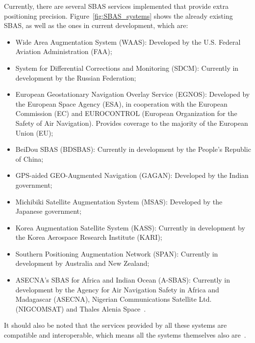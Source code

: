 Currently, there are several SBAS services implemented that provide extra positioning precision. Figure~\ref{fig:SBAS_systems} shows the already existing SBAS, as well as the ones in current development, which are:
\begin{itemize}
    \item Wide Area Augmentation System (WAAS): Developed by the U.S. Federal Aviation Administration (FAA);
    \item System for Differential Corrections and Monitoring (SDCM): Currently in development by the Russian Federation;
    \item European Geostationary Navigation Overlay Service (EGNOS): Developed by the European Space Agency (ESA), in cooperation with the European Commission (EC) and EUROCONTROL (European Organization for the Safety of Air Navigation). Provides coverage to the majority of the European Union (EU);
    \item BeiDou SBAS (BDSBAS): Currently in development by the People's Republic of China;
    \item GPS-aided GEO-Augmented Navigation (GAGAN): Developed by the Indian government;
    \item Michibiki Satellite Augmentation System (MSAS): Developed by the Japanese government;
    \item Korea Augmentation Satellite System (KASS): Currently in development by the Korea Aerospace Research Institute (KARI);
    \item Southern Positioning Augmentation Network (SPAN): Currently in development by Australia and New Zealand;
    \item ASECNA's SBAS for Africa and Indian Ocean (A-SBAS): Currently in development by the Agency for Air Navigation Safety in Africa and Madagascar (ASECNA), Nigerian Communications Satellite Ltd. (NIGCOMSAT) and Thales Alenia Space~\cite{a_sbas_2021}.
\end{itemize}
It should also be noted that the services provided by all these systems are compatible and interoperable, which means all the systems themselves also are~\cite{novatel_gnss,kaplan_2017,sbas_euspa_2021}.


